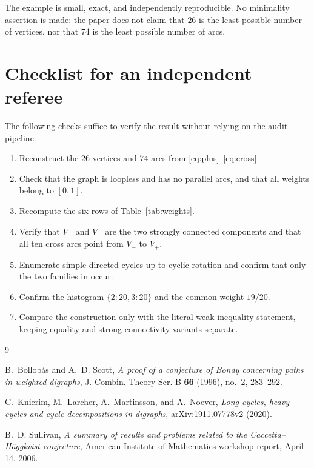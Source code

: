 \documentclass[10pt,reqno]{amsart}
\theoremstyle{definition}
\begin{document}
The example is small, exact, and independently reproducible. No minimality assertion is made: the paper does not claim that $26$ is the least possible number of vertices, nor that $74$ is the least possible number of arcs.

\appendix

\section{Checklist for an independent referee}

The following checks suffice to verify the result without relying on the audit pipeline.

\begin{enumerate}
  \item Reconstruct the $26$ vertices and $74$ arcs from \eqref{eq:plus}--\eqref{eq:cross}.
  \item Check that the graph is loopless and has no parallel arcs, and that all weights belong to $[0,1]$.
  \item Recompute the six rows of Table~\ref{tab:weights}.
  \item Verify that $V_-$ and $V_+$ are the two strongly connected components and that all ten cross arcs point from $V_-$ to $V_+$.
  \item Enumerate simple directed cycles up to cyclic rotation and confirm that only the two families in  occur.
  \item Confirm the histogram $\{2:20,3:20\}$ and the common weight $19/20$.
  \item Compare the construction only with the literal weak-inequality statement, keeping equality and strong-connectivity variants separate.
\end{enumerate}

\begin{thebibliography}{9}

B.~Bollob\'as and A.~D. Scott,
\emph{A proof of a conjecture of Bondy concerning paths in weighted digraphs},
J. Combin. Theory Ser. B \textbf{66} (1996), no.~2, 283--292.

C.~Knierim, M.~Larcher, A.~Martinsson, and A.~Noever,
\emph{Long cycles, heavy cycles and cycle decompositions in digraphs},
arXiv:1911.07778v2 (2020).

B.~D. Sullivan,
\emph{A summary of results and problems related to the Caccetta--H\"aggkvist conjecture},
American Institute of Mathematics workshop report, April 14, 2006.

\end{thebibliography}
\end{document}
